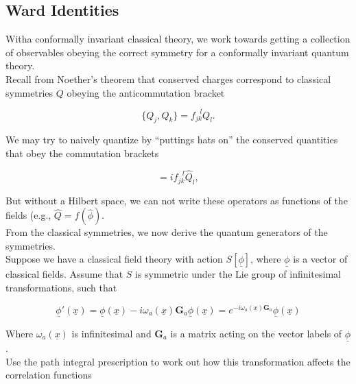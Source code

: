 \subsection*{Ward Identities}

\noindent Witha conformally invariant classical theory, we work towards getting a collection of observables obeying the correct symmetry for a conformally invariant quantum theory. \\

\noindent Recall from Noether's theorem that conserved charges correspond to classical symmetries $Q$ obeying the anticommutation bracket

\begin{equation}
\{ Q_j, Q_k \} = f_{jk}^{\,\,\,\,l} Q_l.
\end{equation}

\noindent We may try to naively quantize by ``puttings hats on'' the conserved quantities that obey the commutation brackets

\begin{equation}
[ \hat{Q}_j, \hat{Q}_k ] = i f_{jk}^{\,\,\,\,l} \hat{Q}_l,
\end{equation}

\noindent But without a Hilbert space, we can not write these operators as functions of the fields (e.g., $\hat{Q} = f(\hat{\phi})$. \\

\noindent From the classical symmetries, we now derive the quantum generators of the symmetries. \\

\noindent Suppose we have a classical field theory with action $S[\underline{\phi}]$, where $\underline{\phi}$ is a vector of classical fields. Assume that $S$ is symmetric under the Lie group of infinitesimal transformations, such that

\begin{equation}
\underline{\phi}' (\underline{x}) = \underline{\phi} (\underline{x}) - i \omega_a (\underline{x}) \textbf{G}_a \underline{\phi} (\underline{x}) = e^{-i \omega_a (\underline{x}) \textbf{G}_a} \underline{\phi} (\underline{x})
\end{equation}

\noindent Where $\omega_a (\underline{x})$ is infinitesimal and $\textbf{G}_a$ is a matrix acting on the vector labels of $\underline{\phi}$. \\

\noindent Use the path integral prescription to work out how this transformation affects the correlation functions

